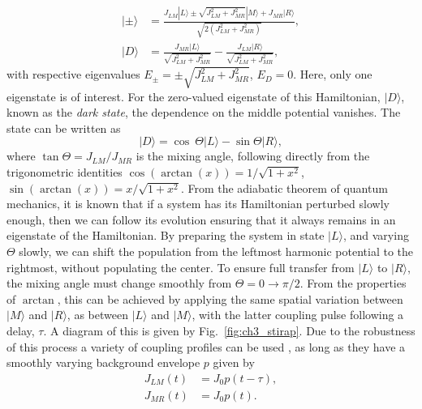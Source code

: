 \begin{subequations}
\begin{align}
    | \pm \rangle &= \frac{J_{LM} |L\rangle \pm \sqrt{J_{LM}^2 + J_{MR}^2}|M\rangle + J_{MR} |R\rangle  }{\sqrt{2(J_{LM}^2 + J_{MR}^2)}}, \\
    | D \rangle &= \frac{J_{MR} |L\rangle }{\sqrt{J_{LM}^2 + J_{MR}^2}} - \frac{J_{LM} |R\rangle}{\sqrt{J_{LM}^2 + J_{MR}^2}},
\end{align}
\end{subequations}
with respective eigenvalues $E_{\pm} = \pm {\sqrt{J_{LM}^2 + J_{MR}^2}}$, $E_D = 0$.
Here, only one eigenstate is of interest. For the zero-valued eigenstate of this Hamiltonian, $|D \rangle$, known as the \textit{dark state}, the dependence on the middle potential vanishes. The state can be written as
\begin{equation}
 | D \rangle = \cos\ \Theta| L \rangle - \sin \Theta | R \rangle,
\end{equation}
where $\tan \Theta=J_{LM}/J_{MR}$ is the mixing angle, following directly from the trigonometric identities $\cos (\arctan (x)) = 1/\sqrt{1+x^2}$, $\sin (\arctan (x)) = x/\sqrt{1+x^2}$. From the adiabatic theorem of quantum mechanics, it is known that if a system has its Hamiltonian perturbed slowly enough, then we can follow its evolution ensuring that it always remains in an eigenstate of the Hamiltonian. By preparing the system in state $| L \rangle$, and varying $\Theta$ slowly, we can shift the population from the leftmost harmonic potential to the rightmost, without populating the center. To ensure full transfer from $|L \rangle$ to $| R \rangle$, the mixing angle must change smoothly from $\Theta = 0 \rightarrow \pi/2$. From the properties of $\arctan$, this can be achieved by applying the same spatial variation between $|M \rangle$ and $| R\rangle$, as between $|L \rangle$ and $| M\rangle$, with the latter coupling pulse following a delay, $\tau$. A diagram of this is given by Fig.~\ref{fig:ch3_stirap}. Due to the robustness of this process a variety of coupling profiles can be used \cite{AO:Bergmann_jcp_2015}, as long as they have a smoothly varying background envelope $p$ given by \cite{AO:Fewell_ausjp_1997}
\begin{subequations}
\begin{align}
    J_{LM}(t) &= J_0 p(t-\tau), \\
    J_{MR}(t) &= J_0 p(t).
\end{align}
\end{subequations}

